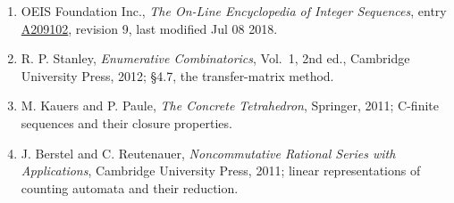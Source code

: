 \documentclass[11pt]{article}
\theoremstyle{definition}
\begin{document}
\begin{enumerate}

\item OEIS Foundation Inc., \emph{The On-Line Encyclopedia of Integer Sequences}, entry \href{https://oeis.org/A209102}{A209102}, revision 9, last modified Jul 08 2018.

\item R. P. Stanley, \emph{Enumerative Combinatorics}, Vol.~1, 2nd ed., Cambridge University Press, 2012; \S4.7, the transfer-matrix method.

\item M. Kauers and P. Paule, \emph{The Concrete Tetrahedron}, Springer, 2011; C-finite sequences and their closure properties.

\item J. Berstel and C. Reutenauer, \emph{Noncommutative Rational Series with Applications}, Cambridge University Press, 2011; linear representations of counting automata and their reduction.

\end{enumerate}
\end{document}
